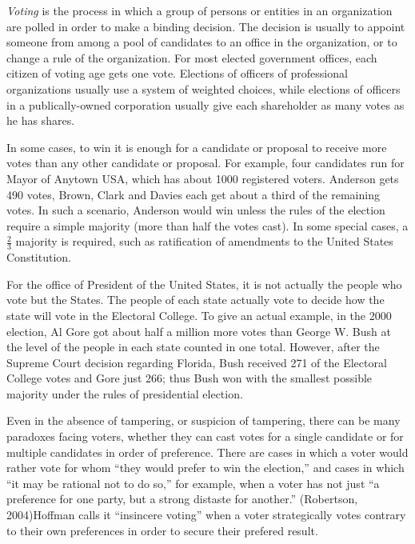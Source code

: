 \documentclass[12pt]{article}
\begin{document}
{\em Voting} is the process in which a group of persons or entities in an organization are polled in order to make a binding decision. The decision is usually to appoint someone from among a pool of candidates to an office in the organization, or to change a rule of the organization. For most elected government offices, each citizen of voting age gets one vote. Elections of officers of professional organizations usually use a system of weighted choices, while elections of officers in a publically-owned corporation usually give each shareholder as many votes as he has shares.

In some cases, to win it is enough for a candidate or proposal to receive more votes than any other candidate or proposal. For example, four candidates run for Mayor of Anytown USA, which has about 1000 registered voters. Anderson gets 490 votes, Brown, Clark and Davies each get about a third of the remaining votes. In such a scenario, Anderson would win unless the rules of the election require a simple majority (more than half the votes cast). In some special cases, a $\frac{2}{3}$ majority is required, such as ratification of amendments to the United States Constitution.

For the office of President of the United States, it is not actually the people who vote but the States. The people of each state actually vote to decide how the state will vote in the Electoral College. To give an actual example, in the 2000 election, Al Gore got about half a million more votes than George W. Bush at the level of the people in each state counted in one total. However, after the Supreme Court decision regarding Florida, Bush received 271 of the Electoral College votes and Gore just 266; thus Bush won with the smallest possible majority under the rules of presidential election.

Even in the absence of tampering, or suspicion of tampering, there can be many paradoxes facing voters, whether they can cast votes for a single candidate or for multiple candidates in order of preference. There are cases in which a voter would rather vote for whom ``they would prefer to win the election,'' and cases in which ``it may be rational not to do so,'' for example, when a voter has not just ``a preference for one party, but a strong distaste for another.'' (Robertson, 2004)Hoffman calls it ``insincere voting'' when a voter strategically votes contrary to their own preferences in order to secure their prefered result.
\end{document}
